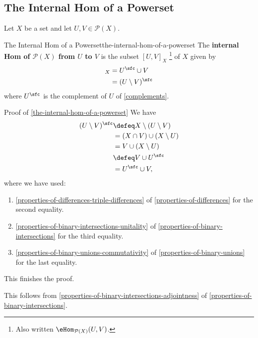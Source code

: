 \subsection{The Internal Hom of a Powerset}\label{subsection-the-internal-hom-of-a-powerset}
Let $X$ be a set and let $U,V\in\mathcal{P}(X)$.
\begin{proposition}{The Internal Hom of a Powerset}{the-internal-hom-of-a-powerset}%
    The \textbf{internal Hom of $\mathcal{P}(X)$ from $U$ to $V$} is the subset $[U,V]_{X}$%
    \footnote{%
        Also written $\eHom_{\mathcal{P}(X)}(U,V)$.
        \par\vspace*{\TCBBoxCorrection}
    } %
    of $X$ given by
    \begin{align*}
        [U,V]_{X} &=      U^{\sfc}\cup V\\%
                  &=      (U\setminus V)^{\sfc}%
    \end{align*}
    where $U^{\sfc}$ is the complement of $U$ of \cref{complements}.
\end{proposition}
\begin{Proof}{Proof of \cref{the-internal-hom-of-a-powerset}}%
    We have
    \begin{align*}
        (U\setminus V)^{\sfc} &\defeq X\setminus(U\setminus V)\\%
                              &=      (X\cap V)\cup(X\setminus U)\\%
                              &=      V\cup(X\setminus U)\\%
                              &\defeq V\cup U^{\sfc}\\%
                              &=      U^{\sfc}\cup V,%
    \end{align*}
    where we have used:
    \begin{enumerate}
        \item\label{proof-of-the-internal-hom-of-a-powerset-1}\cref{properties-of-differences-triple-differences} of \cref{properties-of-differences} for the second equality.
        \item\label{proof-of-the-internal-hom-of-a-powerset-2}\cref{properties-of-binary-intersections-unitality} of \cref{properties-of-binary-intersections} for the third equality.
        \item\label{proof-of-the-internal-hom-of-a-powerset-3}\cref{properties-of-binary-unions-commutativity} of \cref{properties-of-binary-unions} for the last equality.
    \end{enumerate}
    This finishes the proof.

    This follows from \cref{properties-of-binary-intersections-adjointness} of \cref{properties-of-binary-intersections}.
\end{Proof}
